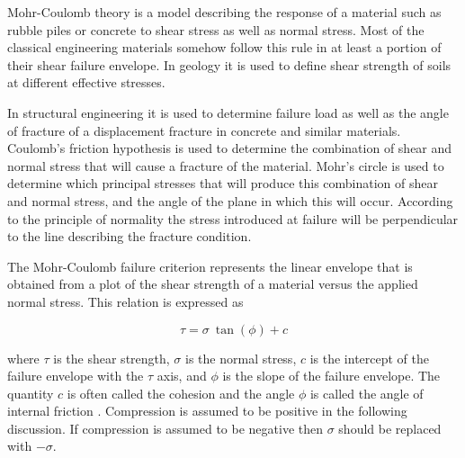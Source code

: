 Mohr-Coulomb theory is a model describing the response of a material such as rubble piles or concrete to shear stress as well as normal stress. 
Most of the classical engineering materials somehow follow this rule in at least a portion of their shear failure envelope. In geology it is used to define shear strength of soils at different effective stresses.

In structural engineering it is used to determine failure load as well as the angle of fracture of a displacement fracture in concrete and similar materials. Coulomb's friction hypothesis is used to determine the combination of shear and normal stress that will cause a fracture of the material. Mohr's circle is used to determine which principal stresses that will produce this combination of shear and normal stress, and the angle of the plane in which this will occur. According to the principle of normality the stress introduced at failure will be perpendicular to the line describing the fracture condition.


The Mohr-Coulomb failure criterion represents the linear envelope that is obtained from a plot of the shear strength of a material 
versus the applied normal stress. This relation is expressed as

\[
\tau = \sigma~\tan(\phi) + c 
\]

where $\tau$ is the shear strength, $\sigma$ is the normal stress, $c$ is the intercept of the failure envelope with the $\tau$ axis, and $\phi$ is the slope of the failure envelope. The quantity $c$ is often called the cohesion and the angle $\phi$ is called the angle of internal friction . Compression is assumed to be positive in the following discussion. If compression is assumed to be negative then $\sigma$ should be replaced with $-\sigma$.


